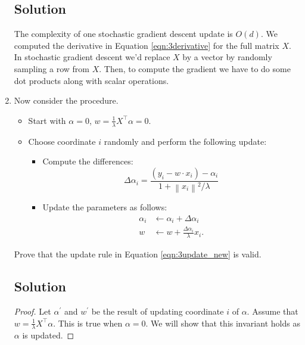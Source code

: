 \begin{enumerate}
  \subsection*{Solution}

  The complexity of one stochastic gradient descent update is $O(d)$. We
  computed the derivative in Equation \ref{eqn:3derivative} for the full matrix
  $X$. In stochastic gradient descent we'd replace $X$ by a vector by randomly
  sampling a row from $X$. Then, to compute the gradient we have to do some dot
  products along with scalar operations.
\item Now consider the procedure.
  \begin{itemize}
  \item Start with $\alpha = 0$, $w = \frac{1}{\lambda}X^\intercal \alpha = 0.$
  \item Choose coordinate $i$ randomly and perform the following update:
    \begin{itemize}
    \item Compute the differences:
      \begin{equation}
        \Delta \alpha_i = \frac{\left(y_i - w \cdot x_i\right) - \alpha_i}{
          1 + \left\lVert x_i\right\rVert^2 / \lambda}
        \label{eqn:3alpha_delta}
      \end{equation}
    \item Update the parameters as follows:
      \begin{align}
        \alpha_i &\leftarrow \alpha_i + \Delta\alpha_i \nonumber\\
        w &\leftarrow w + \frac{\Delta \alpha_i}{\lambda}x_i.
            \label{eqn:3update_new}
      \end{align}
    \end{itemize}
  \end{itemize}
  Prove that the update rule in Equation \ref{eqn:3update_new} is valid.

  \subsection*{Solution}
  \begin{proof}
    Let $\alpha^\prime$ and $w^\prime$ be the result of updating coordinate $i$
    of $\alpha$. Assume that $w = \frac{1}{\lambda}X^\intercal\alpha$. This is
    true when $\alpha = 0$. We will show that this invariant holds as $\alpha$
    is updated.
    

\end{proof}
\end{enumerate}
